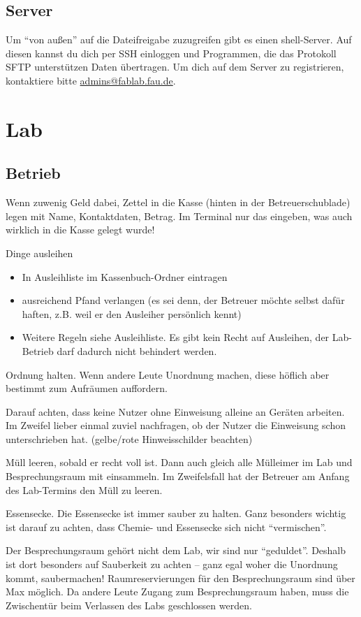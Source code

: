 \documentclass{\basedir/fablab-document}
\begin{document}
\subsection{Server}
Um \enquote{von außen} auf die Dateifreigabe zuzugreifen gibt es einen shell-Server.
Auf diesen kannst du dich per SSH einloggen und Programmen, die das Protokoll SFTP unterstützen Daten übertragen.
Um dich auf dem Server zu registrieren, kontaktiere bitte \url{admins@fablab.fau.de}.

\section{Lab}
\subsection{Betrieb}
Wenn zuwenig Geld dabei, Zettel in die Kasse (hinten in der Betreuerschublade) legen mit Name, Kontaktdaten, Betrag.
Im Terminal nur das eingeben, was auch wirklich in die Kasse gelegt wurde!

Dinge ausleihen
\begin{itemize}
 \item In Ausleihliste im Kassenbuch-Ordner eintragen
 \item ausreichend Pfand verlangen (es sei denn, der Betreuer möchte selbst dafür haften, z.B. weil er den Ausleiher persönlich kennt)
 \item Weitere Regeln siehe Ausleihliste. Es gibt kein Recht auf Ausleihen, der Lab-Betrieb darf dadurch nicht behindert werden.
\end{itemize}

Ordnung halten. Wenn andere Leute Unordnung machen, diese höflich aber bestimmt zum Aufräumen auffordern.

Darauf achten, dass keine Nutzer ohne Einweisung alleine an Geräten arbeiten. Im Zweifel lieber einmal zuviel nachfragen, ob der Nutzer die Einweisung schon unterschrieben hat. (gelbe/rote Hinweisschilder beachten)

Müll leeren, sobald er recht voll ist. Dann auch gleich alle Mülleimer im Lab und Besprechungsraum mit einsammeln. Im Zweifelsfall hat der Betreuer am Anfang des Lab-Termins den Müll zu leeren.

Essensecke. Die Essensecke ist immer sauber zu halten. Ganz besonders wichtig ist darauf zu achten, dass Chemie- und Essensecke sich nicht \enquote{vermischen}.

Der Besprechungsraum gehört nicht dem Lab, wir sind nur \enquote{geduldet}. Deshalb ist dort besonders auf Sauberkeit zu achten -- ganz egal woher die Unordnung kommt, saubermachen!
Raumreservierungen für den Besprechungsraum sind über Max möglich. Da andere Leute Zugang zum Besprechungsraum haben, muss die Zwischentür beim Verlassen des Labs geschlossen werden.
\end{document}
